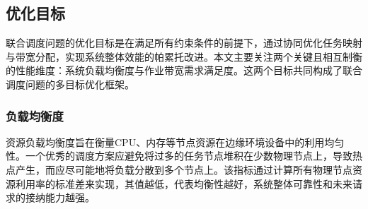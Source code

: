 \subsection{优化目标}
联合调度问题的优化目标是在满足所有约束条件的前提下，通过协同优化任务映射与带宽分配，实现系统整体效能的帕累托改进。本文主要关注两个关键且相互制衡的性能维度：系统负载均衡度与作业带宽需求满足度。这两个目标共同构成了联合调度问题的多目标优化框架。
\subsubsection{负载均衡度}
资源负载均衡度旨在衡量CPU、内存等节点资源在边缘环境设备中的利用均匀性。一个优秀的调度方案应避免将过多的任务节点堆积在少数物理节点上，导致热点产生，而应尽可能地将负载分散到多个节点上。该指标通过计算所有物理节点资源利用率的标准差来实现，其值越低，代表均衡性越好，系统整体可靠性和未来请求的接纳能力越强。

